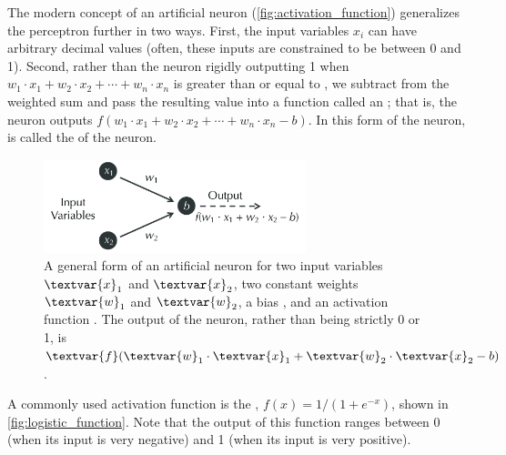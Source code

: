 The modern concept of an artificial neuron (\autoref{fig:activation_function}) generalizes the perceptron further in two ways. First, the input variables $x_i$ can have arbitrary decimal values (often, these inputs are constrained to be between 0 and 1). Second, rather than the neuron rigidly outputting 1 when $w_1 \cdot x_1 + w_2 \cdot x_2 + \cdots + w_n \cdot x_n$ is greater than or equal to , we subtract  from the weighted sum and pass the resulting value into a function  called an ; that is, the neuron outputs $f(w_1 \cdot x_1 + w_2 \cdot x_2 + \cdots + w_n \cdot x_n - b)$. In this form of the neuron,  is called the  of the neuron.\\

\begin{figure}[h]
\centering
\mySfFamily
\includegraphics[width = 0.68\textwidth]{../images_CMYK/activation_function}
\caption{A general form of an artificial neuron for two input variables $\textvar{x}_\text{1}$ and $\textvar{x}_\text{2}$, two constant weights $\textvar{w}_\text{1}$ and $\textvar{w}_\text{2}$, a bias , and an activation function . The output of the neuron, rather than being strictly 0 or 1, is $\textvar{f}(\textvar{w}_\text{1} \cdot \textvar{x}_\text{1} + \textvar{w}_\text{2} \cdot \textvar{x}_\text{2} - b)$.}
\label{fig:activation_function}
\end{figure}

A commonly used activation function is the , $f(x) = 1/(1+e^{-x})$, shown in \autoref{fig:logistic_function}. Note that the output of this function ranges between 0 (when its input is very negative) and 1 (when its input is very positive).\\



